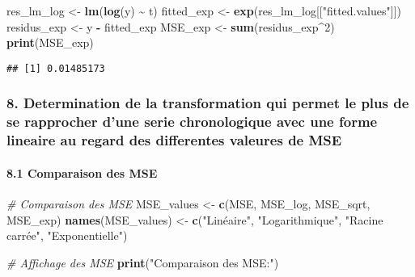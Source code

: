 \documentclass[
]{article}
\newenvironment{Shaded}{\begin{snugshade}}{\end{snugshade}}
\newcommand{\CommentTok}[1]{\textcolor[rgb]{0.56,0.35,0.01}{\textit{#1}}}
\newcommand{\DecValTok}[1]{\textcolor[rgb]{0.00,0.00,0.81}{#1}}
\newcommand{\FunctionTok}[1]{\textcolor[rgb]{0.13,0.29,0.53}{\textbf{#1}}}
\newcommand{\NormalTok}[1]{#1}
\newcommand{\OtherTok}[1]{\textcolor[rgb]{0.56,0.35,0.01}{#1}}
\newcommand{\SpecialCharTok}[1]{\textcolor[rgb]{0.81,0.36,0.00}{\textbf{#1}}}
\newcommand{\StringTok}[1]{\textcolor[rgb]{0.31,0.60,0.02}{#1}}
\begin{document}
\begin{Shaded}
\begin{Highlighting}[]
\NormalTok{res\_lm\_log }\OtherTok{\textless{}{-}} \FunctionTok{lm}\NormalTok{(}\FunctionTok{log}\NormalTok{(y) }\SpecialCharTok{\textasciitilde{}}\NormalTok{ t)}
\NormalTok{fitted\_exp }\OtherTok{\textless{}{-}} \FunctionTok{exp}\NormalTok{(res\_lm\_log[[}\StringTok{"fitted.values"}\NormalTok{]])}
\NormalTok{residus\_exp }\OtherTok{\textless{}{-}}\NormalTok{ y }\SpecialCharTok{{-}}\NormalTok{ fitted\_exp}
\NormalTok{MSE\_exp }\OtherTok{\textless{}{-}} \FunctionTok{sum}\NormalTok{(residus\_exp}\SpecialCharTok{\^{}}\DecValTok{2}\NormalTok{)}
\FunctionTok{print}\NormalTok{(MSE\_exp)}
\end{Highlighting}
\end{Shaded}

\begin{verbatim}
## [1] 0.01485173
\end{verbatim}

\subsubsection{8. Determination de la transformation qui permet le plus
de se rapprocher d'une serie chronologique avec une forme lineaire au
regard des differentes valeures de
MSE}\label{determination-de-la-transformation-qui-permet-le-plus-de-se-rapprocher-dune-serie-chronologique-avec-une-forme-lineaire-au-regard-des-differentes-valeures-de-mse}

\paragraph{8.1 Comparaison des MSE}\label{comparaison-des-mse}

\begin{Shaded}
\begin{Highlighting}[]
\CommentTok{\# Comparaison des MSE}
\NormalTok{MSE\_values }\OtherTok{\textless{}{-}} \FunctionTok{c}\NormalTok{(MSE, MSE\_log, MSE\_sqrt, MSE\_exp)}
\FunctionTok{names}\NormalTok{(MSE\_values) }\OtherTok{\textless{}{-}} \FunctionTok{c}\NormalTok{(}\StringTok{"Linéaire"}\NormalTok{, }\StringTok{"Logarithmique"}\NormalTok{, }\StringTok{"Racine carrée"}\NormalTok{, }\StringTok{"Exponentielle"}\NormalTok{)}

\CommentTok{\# Affichage des MSE}
\FunctionTok{print}\NormalTok{(}\StringTok{"Comparaison des MSE:"}\NormalTok{)}
\end{Highlighting}
\end{Shaded}
\end{document}
